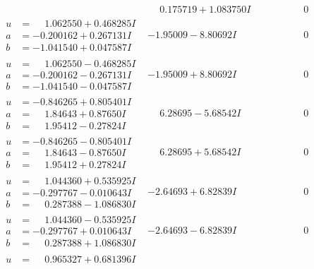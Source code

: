 \documentclass[1p]{elsarticle_modified}
\theoremstyle{definition}
\begin{document}
$$\begin{array}{c|c|c}
 & \phantom{-}0.175719 + 1.083750 I & \phantom{-0.000000 } 0 \\ \hline\begin{aligned}
u &= \phantom{-}1.062550 + 0.468285 I \\
a &= -0.200162 + 0.267131 I \\
b &= -1.041540 + 0.047587 I\end{aligned}
 & -1.95009 - 8.80692 I & \phantom{-0.000000 } 0 \\ \hline\begin{aligned}
u &= \phantom{-}1.062550 - 0.468285 I \\
a &= -0.200162 - 0.267131 I \\
b &= -1.041540 - 0.047587 I\end{aligned}
 & -1.95009 + 8.80692 I & \phantom{-0.000000 } 0 \\ \hline\begin{aligned}
u &= -0.846265 + 0.805401 I \\
a &= \phantom{-}1.84643 + 0.87650 I \\
b &= \phantom{-}1.95412 - 0.27824 I\end{aligned}
 & \phantom{-}6.28695 - 5.68542 I & \phantom{-0.000000 } 0 \\ \hline\begin{aligned}
u &= -0.846265 - 0.805401 I \\
a &= \phantom{-}1.84643 - 0.87650 I \\
b &= \phantom{-}1.95412 + 0.27824 I\end{aligned}
 & \phantom{-}6.28695 + 5.68542 I & \phantom{-0.000000 } 0 \\ \hline\begin{aligned}
u &= \phantom{-}1.044360 + 0.535925 I \\
a &= -0.297767 - 0.010643 I \\
b &= \phantom{-}0.287388 - 1.086830 I\end{aligned}
 & -2.64693 + 6.82839 I & \phantom{-0.000000 } 0 \\ \hline\begin{aligned}
u &= \phantom{-}1.044360 - 0.535925 I \\
a &= -0.297767 + 0.010643 I \\
b &= \phantom{-}0.287388 + 1.086830 I\end{aligned}
 & -2.64693 - 6.82839 I & \phantom{-0.000000 } 0 \\ \hline\begin{aligned}
u &= \phantom{-}0.965327 + 0.681396 I \\

\end{aligned}
\end{array}$$
\end{document}
